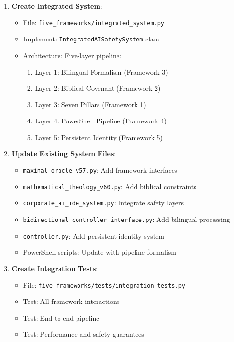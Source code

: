 \documentclass[12pt]{article}
\begin{document}
\begin{enumerate}
    \item \textbf{Create Integrated System}:
    \begin{itemize}
        \item File: \texttt{five\_frameworks/integrated\_system.py}
        \item Implement: \texttt{IntegratedAISafetySystem} class
        \item Architecture: Five-layer pipeline:
        \begin{enumerate}
            \item Layer 1: Bilingual Formalism (Framework 3)
            \item Layer 2: Biblical Covenant (Framework 2)
            \item Layer 3: Seven Pillars (Framework 1)
            \item Layer 4: PowerShell Pipeline (Framework 4)
            \item Layer 5: Persistent Identity (Framework 5)
        \end{enumerate}
    \end{itemize}

    \item \textbf{Update Existing System Files}:
    \begin{itemize}
        \item \texttt{maximal\_oracle\_v57.py}: Add framework interfaces
        \item \texttt{mathematical\_theology\_v60.py}: Add biblical constraints
        \item \texttt{corporate\_ai\_ide\_system.py}: Integrate safety layers
        \item \texttt{bidirectional\_controller\_interface.py}: Add bilingual processing
        \item \texttt{controller.py}: Add persistent identity system
        \item PowerShell scripts: Update with pipeline formalism
    \end{itemize}

    \item \textbf{Create Integration Tests}:
    \begin{itemize}
        \item File: \texttt{five\_frameworks/tests/integration\_tests.py}
        \item Test: All framework interactions
        \item Test: End-to-end pipeline
        \item Test: Performance and safety guarantees
    \end{itemize}
\end{enumerate}
\end{document}
